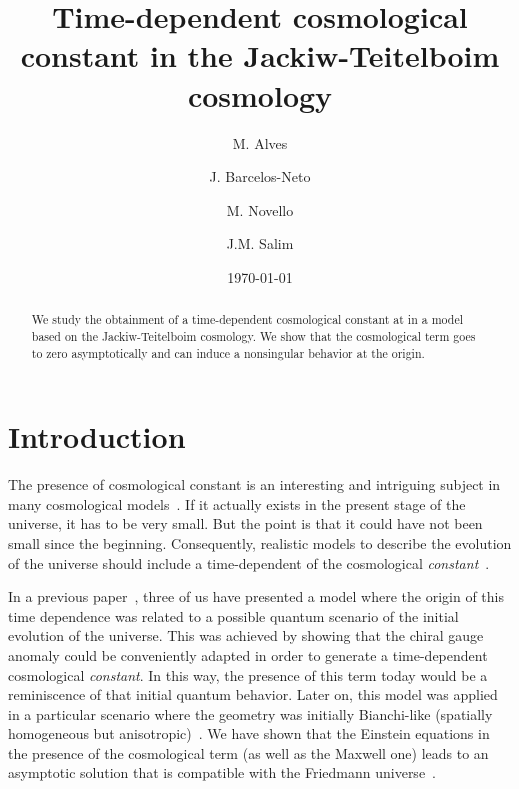 \documentclass[a4paper,twocolumn,prd,groupedaddress,nofootinbib,showpacs]
{revtex4}
\begin{document}
\title{Time-dependent cosmological constant in the
Jackiw-Teitelboim cosmology}

\author{M. Alves}
\author{J. Barcelos-Neto}
\author{M. Novello}
\author{J.M. Salim}

\date{\today}

\begin{abstract}
We study the obtainment of a time-dependent cosmological constant at
\coordHE{} in a model based on the Jackiw-Teitelboim cosmology. We show
that the cosmological term goes to zero asymptotically and can induce
a nonsingular behavior at the origin.
\end{abstract}


\maketitle

\section{Introduction}

The presence of cosmological constant is an interesting and intriguing
subject in many cosmological models~\cite{Weinberg}. If it actually
exists in the present stage of the universe, it has to be very small.
But the point is that it could have not been small since the
beginning. Consequently, realistic models to describe the evolution of
the universe should include a time-dependent of the cosmological {\it
constant}~\cite{Ozer}.

\medskip
In a previous paper~\cite{Novello1}, three of us have presented a
model where the origin of this time dependence was  related to a
possible quantum scenario of the initial evolution of the universe.
This was achieved by showing that the chiral gauge anomaly could be
conveniently adapted in order to generate a time-dependent
cosmological {\it constant}. In this way, the presence of this term
today would be a reminiscence of that initial quantum behavior. Later
on, this model was applied~\cite{Novello2} in a particular scenario
where the geometry was initially Bianchi-like (spatially homogeneous
but anisotropic)~\cite{Belinsky}. We have shown that the Einstein
equations in the presence of the cosmological term (as well as the
Maxwell one) leads to an asymptotic solution that is compatible with
the Friedmann universe~\cite{Weinberg,Novello3}.
\end{document}
